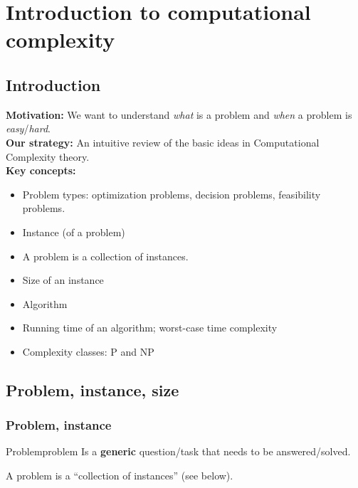 

%
%

\chapter{Introduction to computational complexity}


\section{Introduction}

{\bf Motivation:} We want to understand {\em what} is a problem and {\em when} a problem is {\em easy}/{\em hard}.\\

{\bf Our strategy:} An intuitive review of the basic ideas in Computational Complexity theory.\\ 

{\bf Key concepts:}
	\begin{itemize}
		\item Problem types: optimization problems, decision problems, feasibility problems.
		\item Instance (of a problem)
		\item A problem is a collection of instances.
		\item Size of an instance
		\item Algorithm
		\item Running time of an algorithm; worst-case time complexity
		\item Complexity classes: ${\mathup{P}}$ and ${\mathup{NP}}$
\end{itemize}

\section{Problem, instance, size}
\subsection{Problem, instance}
\begin{definition}{Problem}{problem}
Is a {\bf generic} question/task that needs to be answered/solved. 

A problem is a ``collection of instances'' (see below).
\end{definition}


